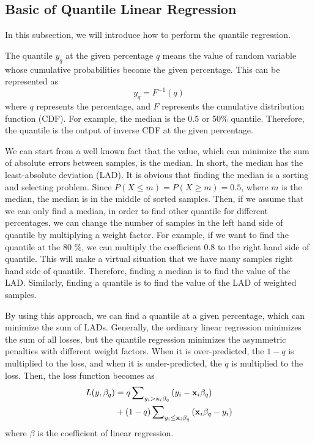 \documentclass[journal]{IEEEtran} %
\begin{document}
\subsection{Basic of Quantile Linear Regression}
In this subsection, we will introduce how to perform the quantile regression.

The quantile $y_q$ at the given percentage $q$ means the value of random variable whose cumulative probabilities become the given percentage. This can be represented as 
\begin{equation}
\label{QuantileDefinition}
{y_q} = {F^{ - 1}}(q)
\end{equation}
where $q$ represents the percentage, and $F$ represents the cumulative distribution function (CDF). 
For example, the median is the 0.5 or 50\% quantile. Therefore, the quantile is the output of inverse CDF at the given percentage.




We can start from a well known fact that the value, which can minimize the sum of absolute errors between samples, is the median. In short, the median has the least-absolute deviation (LAD). It is obvious that finding the median is a sorting and selecting problem. Since $P(X \le m) = P(X \ge m) = 0.5$, where $m$ is the median, the median is in the middle of sorted samples. Then, if we assume that we can only find a median, in order to find other quantile for different percentages, we can change the number of samples in the left hand side of quantile by multiplying a weight factor. For example, if we want to find the quantile at the 80 \%, we can multiply the coefficient 0.8 to the right hand side of quantile. This will make a virtual situation that we have many samples right hand side of quantile. Therefore, finding a median is to find the value of the LAD. Similarly, finding a quantile is to find the value of the LAD of weighted samples.


By using this approach, we can find a quantile at a given percentage, which can minimize the sum of LADs. 
Generally, the ordinary linear regression minimizes the sum of all losses, but the quantile regression minimizes the asymmetric penalties with different weight factors. When it is over-predicted, the $1-q$ is multiplied to the loss, and when it is under-predicted, the $q$ is multiplied to the loss. Then, the loss function becomes as
\begin{equation}
\label{QuantileLossFunction}
\begin{aligned}
L(y,{\beta _q}) & = q\sum\nolimits_{{y_i} > {{\bf{x}}_i}{\beta _q}} {({y_i} - {{\bf{x}}_i}{\beta _q})}  \\ & + (1 - q)\sum\nolimits_{{y_i} \le {{\bf{x}}_i}{\beta _q}} {({{\bf{x}}_i}{\beta _q} - {y_i})}
\end{aligned}
\end{equation}
where $\beta$ is the coefficient of linear regression.
\end{document}
